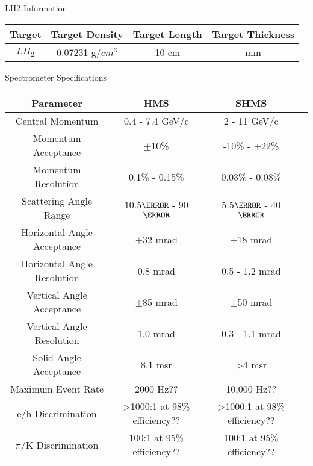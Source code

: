 \begin{Mtable}{LH2 Information}
  \centering
  \begin{tabular}{|c|c|c|c|}
    \hline
    \textbf{Target} & \textbf{Target Density} & \textbf{Target Length} & \textbf{Target Thickness} \\
    \hline
    $LH_2$ & 0.07231 g/$cm^3$ & 10 cm & mm \\
    \hline
    \end{tabular}
  \label{tab:2-3_lh2_properties}
\end{Mtable}

%
%

\begin{Mtable}{Spectrometer Specifications}
  \centering
  \begin{tabular}{|c|c|c|c|}
    \hline
    \textbf{Parameter} & \textbf{HMS} & \textbf{SHMS}\\
    \hline
    Central Momentum & 0.4 - 7.4 GeV/c & 2 - 11 GeV/c \\
    Momentum Acceptance & $\pm$10\% & -10\% - +22\% \\
    Momentum Resolution & 0.1\% - 0.15\% & 0.03\% - 0.08\% \\
    Scattering Angle Range & 10.5$\degree$ - 90$\degree$ & 5.5$\degree$ - 40$\degree$ \\
    \hline
    Horizontal Angle Acceptance & $\pm$32 mrad & $\pm$18 mrad \\
    Horizontal Angle Resolution & 0.8 mrad & 0.5 - 1.2 mrad \\
    Vertical Angle Acceptance & $\pm$85 mrad & $\pm$50 mrad \\
    Vertical Angle Resolution & 1.0 mrad & 0.3 - 1.1 mrad \\
    Solid Angle Acceptance & 8.1 msr & >4 msr \\
    \hline
    Maximum Event Rate & 2000 Hz?? & 10,000 Hz?? \\
    e/h Discrimination & >1000:1 at 98\% efficiency?? & >1000:1 at 98\% efficiency?? \\
    $\pi$/K Discrimination & 100:1 at 95\% efficiency?? & 100:1 at 95\% efficiency?? \\
    \hline
  \end{tabular}
  \caption{Break down of the HMS and SHMS specifications and capablilities..}  
  \label{tab:2-4_spectrometer}
\end{Mtable}

